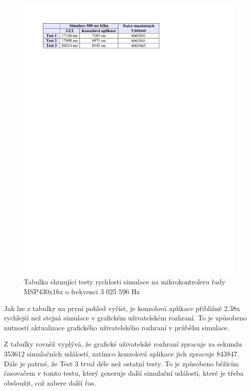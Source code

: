 \begin{figure}[ht]
\centering
\includegraphics[trim=0cm 23.5cm 2cm 2cm]{fig/tabulka1}
\caption{Tabulka shrnující testy rychlosti simulace na mikrokontroleru řady MSP430x16x o frekvenci 3 025 596 Hz}
\label{fig:tabulka1}
\end{figure}

Jak lze z tabulky na první pohled vyčíst, je konzolová aplikace přibližně 2.38x rychlejší než stejná simulace v grafickém uživatelském rozhraní. To je způsobeno nutností aktualizace grafického uživatelského rozhraní v průběhu simulace.

Z tabulky rovněž vyplývá, že grafické uživatelské rozhraní zpracuje za sekundu 353612 simulačních událostí, zatímco konzolová aplikace jich zpracuje 843847. Dále je patrné, že Test 3 trval déle než ostatní testy. To je způsobeno běžícím časovačem v tomto testu, který generuje další simulační události, které je třeba obsloužit, což zabere další čas.

